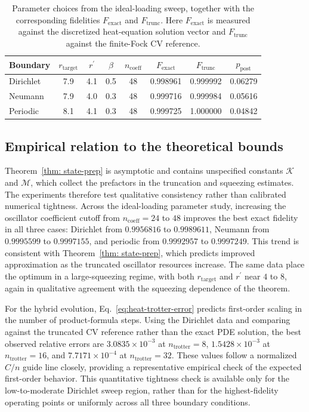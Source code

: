 \begin{table}[h]
\centering
\caption{Parameter choices from the ideal-loading sweep, together with the corresponding fidelities $F_{\mathrm{exact}}$ and $F_{\mathrm{trunc}}$. Here $F_{\mathrm{exact}}$ is measured against the discretized heat-equation solution vector and $F_{\mathrm{trunc}}$ against the finite-Fock CV reference.}
\label{tab:clean_oracle_baseline}
\begin{tabular}{lccccccc}
\toprule
Boundary & $r_{\mathrm{target}}$ & $r^\prime$ & $\beta$ & $n_{\mathrm{coeff}}$ & $F_{\mathrm{exact}}$ & $F_{\mathrm{trunc}}$ & $p_{\mathrm{post}}$ \\
\midrule
Dirichlet & 7.9 & 4.1 & 0.5 & 48 & 0.998961 & 0.999992 & 0.06279 \\
Neumann & 7.9 & 4.0 & 0.3 & 48 & 0.999716 & 0.999984 & 0.05616 \\
Periodic & 8.1 & 4.1 & 0.3 & 48 & 0.999725 & 1.000000 & 0.04842 \\
\bottomrule
\end{tabular}
\end{table}

\subsection{Empirical relation to the theoretical bounds}

Theorem~\ref{thm: state-prep} is asymptotic and contains unspecified constants $\mathcal K$ and $\mathcal M$, which collect the prefactors in the truncation and squeezing estimates. The experiments therefore test qualitative consistency rather than calibrated numerical tightness. Across the ideal-loading parameter study, increasing the oscillator coefficient cutoff from $n_{\mathrm{coeff}}=24$ to $48$ improves the best exact fidelity in all three cases: Dirichlet from $0.9956816$ to $0.9989611$, Neumann from $0.9995599$ to $0.9997155$, and periodic from $0.9992957$ to $0.9997249$. This trend is consistent with Theorem~\ref{thm: state-prep}, which predicts improved approximation as the truncated oscillator resources increase. The same data place the optimum in a large-squeezing regime, with both $r_{\mathrm{target}}$ and $r^\prime$ near $4$ to $8$, again in qualitative agreement with the squeezing dependence of the theorem.

For the hybrid evolution, Eq.~\eqref{eq:heat-trotter-error} predicts first-order scaling in the number of product-formula steps. Using the Dirichlet data and comparing against the truncated CV reference rather than the exact PDE solution, the best observed relative errors are $3.0835\times 10^{-3}$ at $n_{\mathrm{trotter}}=8$, $1.5428\times 10^{-3}$ at $n_{\mathrm{trotter}}=16$, and $7.7171\times 10^{-4}$ at $n_{\mathrm{trotter}}=32$. These values follow a normalized $C/n$ guide line closely, providing a representative empirical check of the expected first-order behavior. This quantitative tightness check is available only for the low-to-moderate Dirichlet sweep region, rather than for the highest-fidelity operating points or uniformly across all three boundary conditions.


